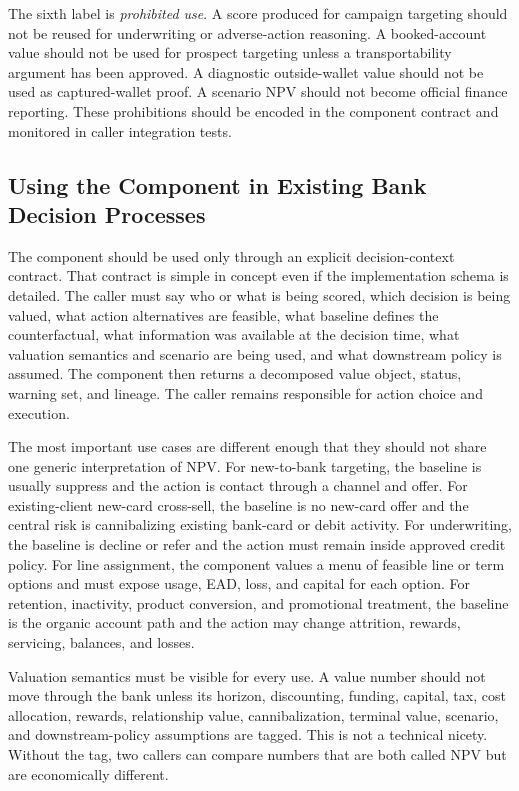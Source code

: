 \documentclass[11pt]{article}
\newcommand{\1}{\mathbf{1}}
\begin{document}
The sixth label is \emph{prohibited use}. A score produced for campaign
targeting should not be reused for underwriting or adverse-action reasoning. A
booked-account value should not be used for prospect targeting unless a
transportability argument has been approved. A diagnostic outside-wallet value
should not be used as captured-wallet proof. A scenario NPV should not become
official finance reporting. These prohibitions should be encoded in the
component contract and monitored in caller integration tests.

\subsection{Using the Component in Existing Bank Decision Processes}
\label{sec:decision-use}

The component should be used only through an explicit decision-context
contract. That contract is simple in concept even if the implementation schema
is detailed. The caller must say who or what is being scored, which decision is
being valued, what action alternatives are feasible, what baseline defines the
counterfactual, what information was available at the decision time, what
valuation semantics and scenario are being used, and what downstream policy is
assumed. The component then returns a decomposed value object, status, warning
set, and lineage. The caller remains responsible for action choice and
execution.

The most important use cases are different enough that they should not share
one generic interpretation of NPV. For new-to-bank targeting, the baseline is
usually suppress and the action is contact through a channel and offer. For
existing-client new-card cross-sell, the baseline is no new-card offer and the
central risk is cannibalizing existing bank-card or debit activity. For
underwriting, the baseline is decline or refer and the action must remain
inside approved credit policy. For line assignment, the component values a
menu of feasible line or term options and must expose usage, EAD, loss, and
capital for each option. For retention, inactivity, product conversion, and
promotional treatment, the baseline is the organic account path and the action
may change attrition, rewards, servicing, balances, and losses.

Valuation semantics must be visible for every use. A value number should not
move through the bank unless its horizon, discounting, funding, capital, tax,
cost allocation, rewards, relationship value, cannibalization, terminal value,
scenario, and downstream-policy assumptions are tagged. This is not a
technical nicety. Without the tag, two callers can compare numbers that are
both called NPV but are economically different.
\end{document}
